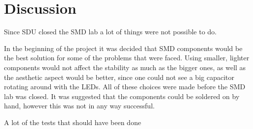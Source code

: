\section{Discussion}

Since SDU closed the SMD lab a lot of things were not possible to do.

In the beginning of the project it was decided that SMD components would be the best solution for some of the problems that were faced.
Using smaller, lighter components would not affect the stability as much as the bigger ones, as well as the aesthetic aspect would be better, since one could not see a big capacitor rotating around with the LEDs.
All of these choices were made before the SMD lab was closed.
It was suggested that the components could be soldered on by hand, however this was not in any way successful. 

A lot of the tests that should have been done